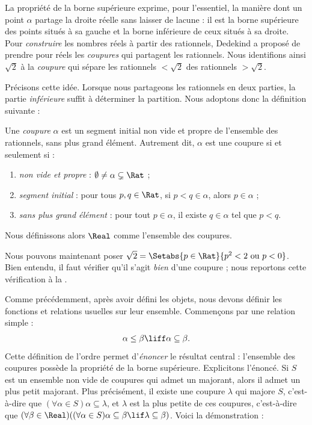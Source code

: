 \documentclass[11pt,a4paper,openany]{memoir}
\begin{document}
La propriété de la borne supérieure exprime, pour l'essentiel, la manière
dont un point $\alpha$ partage la droite réelle sans laisser de lacune :
il est la borne supérieure des points situés à sa gauche et la borne
inférieure de ceux situés à sa droite. Pour \emph{construire} les nombres
réels à partir des rationnels, Dedekind a proposé de prendre pour réels
les \emph{coupures} qui partagent les rationnels. Nous identifions ainsi
$\sqrt{2}$ à la \emph{coupure} qui sépare les rationnels
$< \sqrt{2}$ des rationnels $> \sqrt{2}$.

Précisons cette idée. Lorsque nous partageons les rationnels en deux
parties, la partie \emph{inférieure} suffit à déterminer la partition.
Nous adoptons donc la définition suivante :

\begin{defn}[Coupure]
Une \emph{coupure} $\alpha$ est un segment initial non vide et propre
de l'ensemble des rationnels, sans plus grand élément. Autrement dit,
$\alpha$ est une coupure si et seulement si :
\begin{enumerate}
	\item \emph{non vide et propre} : $\emptyset \neq \alpha \subsetneq \Rat$ ;
	\item \emph{segment initial} : pour tous $p,q \in \Rat$, si $p < q \in \alpha$, alors $p \in \alpha$ ;
	\item \emph{sans plus grand élément} : pour tout $p \in \alpha$, il existe $q \in \alpha$ tel que $p < q$.
\end{enumerate}
Nous définissons alors $\Real$ comme l'ensemble des coupures.
\end{defn}

Nous pouvons maintenant poser $\sqrt{2} = \Setabs{p \in \Rat}{p^2 < 2\text{
ou }p < 0}$. Bien entendu, il faut vérifier qu'il s'agit \emph{bien}
d'une coupure ; nous reportons cette vérification à la .

Comme précédemment, après avoir défini les objets, nous devons définir
les fonctions et relations usuelles sur leur ensemble. Commençons par
une relation simple :
\begin{align*}
	\alpha \leq \beta \liff \alpha \subseteq \beta.
\end{align*}
Cette définition de l'ordre permet d'\emph{énoncer} le résultat central :
l'ensemble des coupures possède la propriété de la borne supérieure.
Explicitons l'énoncé. Si $S$ est un ensemble non vide de coupures qui
admet un majorant, alors il admet un plus petit majorant. Plus précisément,
il existe une coupure $\lambda$ qui majore $S$, c'est-à-dire que
$(\forall \alpha \in S)\alpha \subseteq \lambda$, et $\lambda$ est la plus
petite de ces coupures, c'est-à-dire que
$(\forall \beta \in \Real)((\forall \alpha \in S)\alpha \subseteq \beta \lif \lambda \subseteq \beta)$.
Voici la démonstration :
\end{document}
